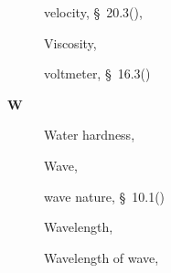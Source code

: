 \begin{multicols}{2}
{\begin{description}
	  \item[] \noindent\raggedright velocity,  \S~20.3(\pageref{m38791}),  \pageref{id2528771}
	  \item[] \noindent\raggedright Viscosity,  \pageref{id2412552}
	  \item[] \noindent\raggedright voltmeter,  \S~16.3(\pageref{m38773})
	  \vspace{.3cm}
	  \item[{\large \bfseries W}]\noindent\raggedright
	  Water hardness,  \pageref{id2491081}
	  \item[] \noindent\raggedright Wave,  \pageref{id2438826}
	  \item[] \noindent\raggedright wave nature,  \S~10.1(\pageref{m38777})
	  \item[] \noindent\raggedright Wavelength,  \pageref{id2445839}
	  \item[] \noindent\raggedright Wavelength of wave,  \pageref{id2440434}
    \end{description}
  }
      \end{multicols}
    \newpage \setlength{\parskip}{0pt}
